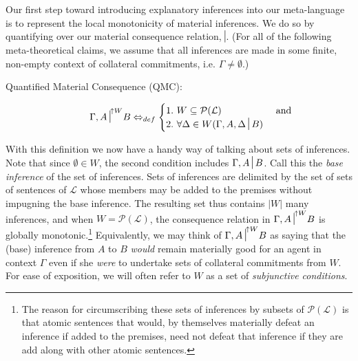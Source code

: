 \documentclass{article}
\newcommand{\nc}{\turnstile{s}{w}{}{}{n}}
\begin{document}
Our first step toward introducing explanatory inferences into our meta-language is to represent the local monotonicity of material inferences. We do so by quantifying over our material consequence relation, $ \nc $. (For all of the following meta-theoretical claims, we assume that all inferences are made in some finite, non-empty context of collateral commitments, i.e. $ \Gamma \neq \emptyset $.)

	\begin{description}
		\item[Quantified Material Consequence (QMC):]
		\begin{equation}
				      {\Gamma, A \nc}^{\uparrow W} B \Leftrightarrow_{def} 
				      \begin{cases}\nonumber
				        1.\,\, W\subseteq\mathcal{P}(\mathcal{L}) & $ and $ \\
						2.\,\, \forall\Delta\in W(\Gamma, A,  \Delta \nc B ) 
						\end{cases}
		\end{equation}
	
	\end{description}  
	
With this definition we now have a handy way of talking about sets of inferences. Note that since $ \emptyset \in W $, the second condition includes $ \Gamma, A \nc B $. Call this the \textit{base inference} of the set of inferences. Sets of inferences are delimited by the set of sets of sentences of $ \mathcal{L} $ whose members may be added to the premises without impugning the base inference. The resulting set thus contains $ |W| $ many inferences,  and when $ W = \mathcal{P}(\mathcal{L}) $, the consequence relation in $ {\Gamma, A \nc}^{\uparrow W} B $ is globally monotonic.\footnote{The reason for circumscribing these sets of inferences by subsets of $ \mathcal{P}(\mathcal{L}) $ is that atomic sentences that would, by themselves materially defeat an inference if added to the premises, need not defeat that inference if they are add along with other atomic sentences.} Equivalently, we may think of $ {\Gamma, A \nc}^{\uparrow W} B $ as saying that the (base) inference from $ A $ to $ B $ \textit{would} remain materially good for an agent in context $ \Gamma $ even if she \textit{were} to undertake sets of collateral commitments from $ W $. For ease of exposition, we will often refer to $W$ as a set of \textit{subjunctive conditions}.
\end{document}
